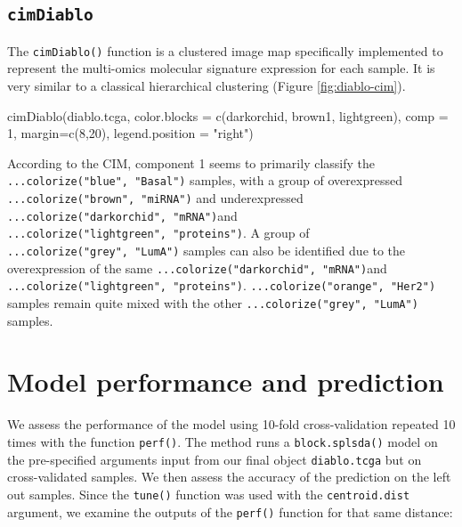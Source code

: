 \documentclass[
]{book}
\newenvironment{Shaded}{\begin{snugshade}}{\end{snugshade}}
\newcommand{\AttributeTok}[1]{\textcolor[rgb]{0.77,0.63,0.00}{#1}}
\newcommand{\DecValTok}[1]{\textcolor[rgb]{0.00,0.00,0.81}{#1}}
\newcommand{\FunctionTok}[1]{\textcolor[rgb]{0.00,0.00,0.00}{#1}}
\newcommand{\NormalTok}[1]{#1}
\newcommand{\StringTok}[1]{\textcolor[rgb]{0.31,0.60,0.02}{#1}}
\begin{document}
\hypertarget{cimdiablo}{%
\subsection{\texorpdfstring{\texttt{cimDiablo}}{cimDiablo}}\label{cimdiablo}}

The \texttt{cimDiablo()} function is a clustered image map specifically implemented to represent the multi-omics molecular signature expression for each sample. It is very similar to a classical hierarchical clustering (Figure \ref{fig:diablo-cim}).

\begin{Shaded}
\begin{Highlighting}[]
\FunctionTok{cimDiablo}\NormalTok{(diablo.tcga, }\AttributeTok{color.blocks =} \FunctionTok{c}\NormalTok{(}\StringTok{\textquotesingle{}darkorchid\textquotesingle{}}\NormalTok{, }\StringTok{\textquotesingle{}brown1\textquotesingle{}}\NormalTok{, }\StringTok{\textquotesingle{}lightgreen\textquotesingle{}}\NormalTok{),}
          \AttributeTok{comp =} \DecValTok{1}\NormalTok{, }\AttributeTok{margin=}\FunctionTok{c}\NormalTok{(}\DecValTok{8}\NormalTok{,}\DecValTok{20}\NormalTok{), }\AttributeTok{legend.position =} \StringTok{"right"}\NormalTok{)}
\end{Highlighting}
\end{Shaded}



According to the CIM, component 1 seems to primarily classify the \texttt{...colorize("blue",\ "Basal")} samples, with a group of overexpressed \texttt{...colorize("brown",\ "miRNA")} and underexpressed \texttt{...colorize("darkorchid",\ "mRNA")}and \texttt{...colorize("lightgreen",\ "proteins")}. A group of \texttt{...colorize("grey",\ "LumA")} samples can also be identified due to the overexpression of the same \texttt{...colorize("darkorchid",\ "mRNA")}and \texttt{...colorize("lightgreen",\ "proteins")}. \texttt{...colorize("orange",\ "Her2")} samples remain quite mixed with the other \texttt{...colorize("grey",\ "LumA")} samples.

\hypertarget{diablo:perf}{%
\section{Model performance and prediction}\label{diablo:perf}}

We assess the performance of the model using 10-fold cross-validation repeated 10 times with the function \texttt{perf()}. The method runs a \texttt{block.splsda()} model on the pre-specified arguments input from our final object \texttt{diablo.tcga} but on cross-validated samples. We then assess the accuracy of the prediction on the left out samples. Since the \texttt{tune()} function was used with the \texttt{centroid.dist} argument, we examine the outputs of the \texttt{perf()} function for that same distance:
\end{document}
